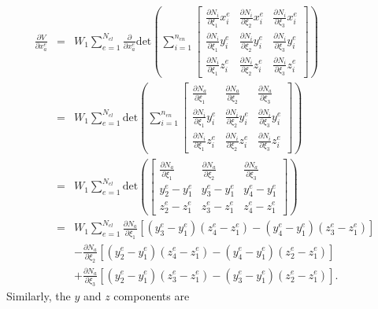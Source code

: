 \begin{eqnarray}
\frac{\partial V}{\partial x_a^e} &=& W_1\sum_{e=1}^{N_{el}} \frac{\partial}{\partial x_a^e}\text{det}\left(\sum_{i=1}^{n_{en}}
\begin{bmatrix}
\frac{\partial N_i}{\partial \xi_1} x_i^e & \frac{\partial N_i}{\partial \xi_2} x_i^e & \frac{\partial N_i}{\partial \xi_3} x_i^e \\
%
\frac{\partial N_i}{\partial \xi_1}y_i^e & \frac{\partial N_i}{\partial \xi_2}y_i^e & \frac{\partial N_i}{\partial \xi_3}y_i^e \\
%
\frac{\partial N_i}{\partial \xi_1}z_i^e & \frac{\partial N_i}{\partial \xi_2}z_i^e & \frac{\partial N_i}{\partial \xi_3}z_i^e 
\end{bmatrix}\right) \\
&=& W_1\sum_{e=1}^{N_{el}} \text{det}\left(\sum_{i=1}^{n_{en}}
%
\begin{bmatrix}
\frac{\partial N_a}{\partial \xi_1}  & \frac{\partial N_a}{\partial \xi_2} & \frac{\partial N_a}{\partial \xi_3} \\
%
\frac{\partial N_i}{\partial \xi_1}y_i^e  & \frac{\partial N_i}{\partial \xi_2}y_i^e & \frac{\partial N_i}{\partial \xi_3}y_i^e \\
%
\frac{\partial N_i}{\partial \xi_1}z_i^e  & \frac{\partial N_i}{\partial \xi_2}z_i^e & \frac{\partial N_i}{\partial \xi_3}z_i^e 
\end{bmatrix}\right) \nonumber\\
&=& W_1\sum_{e=1}^{N_{el}} \text{det}\left(
%
\begin{bmatrix}
\frac{\partial N_a}{\partial \xi_1}  & \frac{\partial N_a}{\partial \xi_2} & \frac{\partial N_a}{\partial \xi_3} \\
%
y_2^e - y_1^e & y_3^e - y_1^e & y_4^e - y_1^e \\
%
z_2^e - z_1^e & z_3^e - z_1^e & z_4^e - z_1^e 
\end{bmatrix}\right)\nonumber\\
&=& W_1\sum_{e=1}^{N_{el}}\frac{\partial N_a}{\partial \xi_1}[(y_3^e - y_1^e)(z_4^e - z_1^e)-(y_4^e - y_1^e)(z_3^e - z_1^e)] \nonumber\\
%
&&-\frac{\partial N_a}{\partial \xi_2}\left[(y_2^e - y_1^e)(z_4^e - z_1^e)-(y_4^e - y_1^e)(z_2^e - z_1^e)\right] \nonumber\\
%
&&+\frac{\partial N_a}{\partial \xi_3}\left[(y_2^e - y_1^e)(z_3^e - z_1^e)-(y_3^e - y_1^e)(z_2^e - z_1^e)\right].
\label{eq:dVdx}
\end{eqnarray}
%
Similarly, the $y$ and $z$ components are
